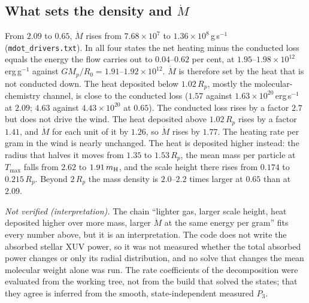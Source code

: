 \documentclass[english,a4paper]{my_memo}
\begin{document}
\subsection{What sets the density and $\dot M$}

From $2.09$ to $0.65$, $\dot M$ rises from $7.68\times10^{7}$ to
$1.36\times10^{8}$\,g\,s$^{-1}$ (\texttt{mdot\_drivers.txt}). In all four
states the net heating minus the conducted loss equals the energy the flow
carries out to $0.04$--$0.62$ per cent, at $1.95$--$1.98\times10^{12}$\,erg\,g$^{-1}$
against $GM_p/R_0 = 1.91$--$1.92\times10^{12}$. $\dot M$ is therefore set
by the heat that is not conducted down. The heat deposited below
$1.02\,R_p$, mostly the molecular-chemistry channel, is close to the
conducted loss ($1.57$ against $1.63\times10^{20}$\,erg\,s$^{-1}$ at $2.09$;
$4.63$ against $4.43\times10^{20}$ at $0.65$). The conducted loss rises
by a factor $2.7$ but does not drive the wind. The heat deposited above
$1.02\,R_p$ rises by a factor $1.41$, and $\dot M$ for each unit of it by
$1.26$, so $\dot M$ rises by $1.77$. The heating rate per gram in the wind
is nearly unchanged. The heat is deposited higher instead: the radius that
halves it moves from $1.35$ to $1.53\,R_p$, the mean mass per particle at
$T_{\max}$ falls from $2.62$ to $1.91\,m_{\rm H}$, and the scale height
there rises from $0.174$ to $0.215\,R_p$. Beyond $2\,R_p$ the mass density
is $2.0$--$2.2$ times larger at $0.65$ than at $2.09$.

\emph{Not verified (interpretation).} The chain ``lighter gas, larger scale
height, heat deposited higher over more mass, larger $\dot M$ at the same
energy per gram'' fits every number above, but it is an interpretation. The
code does not write the absorbed stellar XUV power, so it was not measured
whether the total absorbed power changes or only its radial distribution,
and no solve that changes the mean molecular weight alone was run. The rate
coefficients of the decomposition were evaluated from the working tree, not
from the build that solved the states; that they agree is inferred from the
smooth, state-independent measured $P_3$.
\end{document}

